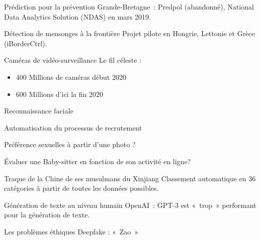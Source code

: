 \begin{frame}{Prédiction pour la prévention}
  Grande-Bretagne~: Predpol (abandonné), National Data Analytics Solution (NDAS) en mars 2019.

\end{frame}

\begin{frame}{Détection de mensonges à la frontière}
  Projet pilote en Hongrie, Lettonie et Grèce (iBorderCtrl).

\end{frame}

\begin{frame}{Caméras de vidéo-surveillance}
  Le fil céleste :

  \begin{itemize}
  \item 400 Millions de caméras début 2020 
  \item 600 Millions d'ici la fin 2020
  \end{itemize}

  \begin{minipage}[c]{0.49\linewidth}
  \end{minipage}\hfill
  \begin{minipage}[c]{0.49\linewidth}
  \end{minipage}\hfill
\end{frame}

\begin{frame}{Reconnaissance faciale}
\end{frame}

\begin{frame}{Automatisation du processus de recrutement}
\end{frame}

\begin{frame}{Préférence sexuelles à partir d'une photo ?}
\end{frame}

\begin{frame}{Évaluer une Baby-sitter en fonction de son activité en ligne?}
\end{frame}

\begin{frame}{Traque de la Chine de ses musulmans du Xinjiang}
  Classement automatique en 36 catégories à partir de toutes les données possibles.

\end{frame}

\begin{frame}{Génération de texte au niveau humain}
  OpenAI~: GPT-3 est «~trop~» performant pour la génération de texte.
\end{frame}

\begin{frame}{Les problèmes éthiques}
  Deepfake : «~Zao~»
\end{frame}
